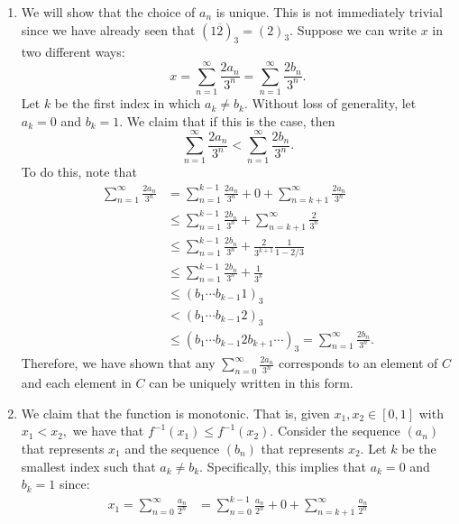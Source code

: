 \documentclass{article}
\numberwithin{equation}{section}
\begin{document}
\begin{enumerate}
\begin{enumerate}[label=Proof of (\arabic*)]
        \item We will show that the choice of $a_n$ is unique. This is not immediately trivial since we have already seen that $(1\overline{2})_3=(2)_3.$ Suppose we can write $x$ in two different ways:
        \begin{equation}
            x = \sum_{n=1}^{\infty} \frac{2a_n}{3^n} = \sum_{n=1}^{\infty} \frac{2b_n}{3^n}.
        \end{equation}
        Let $k$ be the first index in which $a_k \neq b_k.$ Without loss of generality, let $a_k=0$ and $b_k=1.$ We claim that if this is the case, then 
        \begin{equation}
            \sum_{n=1}^{\infty}\frac{2a_n}{3^n} < \sum_{n=1}^{\infty}\frac{2b_n}{3^n}.
        \end{equation}
        To do this, note that 
        \begin{align}
            \sum_{n=1}^{\infty} \frac{2a_n}{3^n} &= \sum_{n=1}^{k-1} \frac{2a_n}{3^n} + 0 + \sum_{n=k+1}^{\infty}\frac{2a_n}{3^n} \\ 
            & \le \sum_{n=1}^{k-1}\frac{2b_n}{3^n} + \sum_{n=k+1}^{\infty}\frac{2}{3^n} \\ 
            & \le \sum_{n=1}^{k-1}\frac{2b_n}{3^n} + \frac{2}{3^{k+1}}\frac{1}{1-2/3} \\ 
            & \le \sum_{n=1}^{k-1} \frac{2b_n}{3^n} + \frac{1}{3^k} \\ 
            &\le (b_1\cdots b_{k-1} 1)_3 \\ 
            &< (b_1\cdots b_{k-1} 2)_3 \\
            &\le (b_1\cdots b_{k-1} 2b_{k+1}\cdots )_3 = \sum_{n=1}^{\infty}\frac{2b_n}{3^n}.
        \end{align}
        Therefore, we have shown that any $\sum_{n=0}^{\infty} \frac{2a_n}{3^n}$ corresponds to an element of $C$ and each element in $C$ can be uniquely written in this form.
        \item We claim that the function is monotonic. That is, given $x_1,x_2\in [0,1]$ with $x_1 < x_2,$ we have that $f^{-1}(x_1) \le f^{-1}(x_2).$ Consider the sequence $(a_n)$ that represents $x_1$ and the sequence $(b_n)$ that represents $x_2.$ Let $k$ be the smallest index such that $a_k \neq b_k.$ Specifically, this implies that $a_k=0$ and $b_k=1$ since:
        \begin{align}
            x_1 = \sum_{n=0}^{\infty} \frac{a_n}{2^n} &= \sum_{n=0}^{k-1}\frac{a_n}{2^n} + 0 + \sum_{n=k+1}^{\infty}\frac{a_n}{2^n} \\

\end{align}
\end{enumerate}
\end{enumerate}
\end{document}
